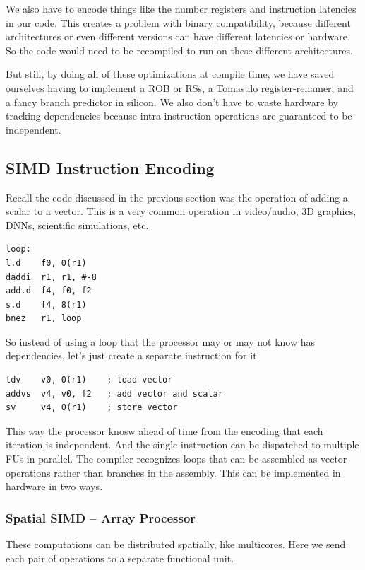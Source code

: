\documentclass{article}
\begin{document}
We also have to encode things like the number registers and instruction latencies in our code. This creates a problem with binary compatibility, because different architectures or even different versions can have different latencies or hardware. So the code would need to be recompiled to run on these different architectures. 

But still, by doing all of these optimizations at compile time, we have saved ourselves having to implement a ROB or RSs, a Tomasulo register-renamer, and a fancy branch predictor in silicon. We also don't have to waste hardware by tracking dependencies because intra-instruction operations are guaranteed to be independent.

\subsection{SIMD Instruction Encoding}

Recall the code discussed in the previous section was the operation of adding a scalar to a vector. This is a very common operation in video/audio, 3D graphics, DNNs, scientific simulations, etc. 

\scriptsize
\begin{verbatim}
loop:
l.d    f0, 0(r1)    
daddi  r1, r1, #-8  
add.d  f4, f0, f2    
s.d    f4, 8(r1)   
bnez   r1, loop     
\end{verbatim}
\normalsize

So instead of using a loop that the processor may or may not know has dependencies, let's just create a separate instruction for it. 

\scriptsize
\begin{verbatim}
ldv    v0, 0(r1)    ; load vector
addvs  v4, v0, f2   ; add vector and scalar
sv     v4, 0(r1)    ; store vector
\end{verbatim}
\normalsize

This way the processor knosw ahead of time from the encoding that each iteration is independent. And the single instruction can be dispatched to multiple FUs in parallel. The compiler recognizes loops that can be assembled as vector operations rather than branches in the assembly. This can be implemented in hardware in two ways.

\subsubsection{Spatial SIMD -- Array Processor}

These computations can be distributed spatially, like multicores. Here we send each pair of operations to a separate functional unit. 
\end{document}
